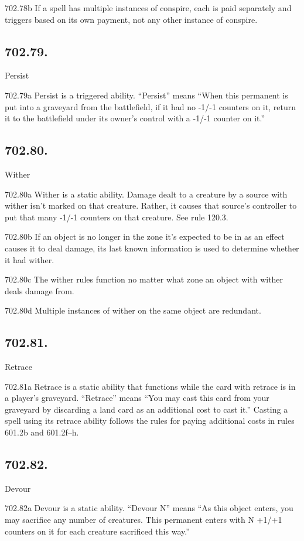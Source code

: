 702.78b If a spell has multiple instances of conspire, each is paid separately and triggers based on its own payment, not any other instance of conspire.

\subsection*{702.79.}
Persist

702.79a Persist is a triggered ability. “Persist” means “When this permanent is put into a graveyard from the battlefield, if it had no -1/-1 counters on it, return it to the battlefield under its owner’s control with a -1/-1 counter on it.”

\subsection*{702.80.}
Wither

702.80a Wither is a static ability. Damage dealt to a creature by a source with wither isn’t marked on that creature. Rather, it causes that source’s controller to put that many -1/-1 counters on that creature. See rule 120.3.

702.80b If an object is no longer in the zone it’s expected to be in as an effect causes it to deal damage, its last known information is used to determine whether it had wither.

702.80c The wither rules function no matter what zone an object with wither deals damage from.

702.80d Multiple instances of wither on the same object are redundant.

\subsection*{702.81.}
Retrace

702.81a Retrace is a static ability that functions while the card with retrace is in a player’s graveyard. “Retrace” means “You may cast this card from your graveyard by discarding a land card as an additional cost to cast it.” Casting a spell using its retrace ability follows the rules for paying additional costs in rules 601.2b and 601.2f–h.

\subsection*{702.82.}
Devour

702.82a Devour is a static ability. “Devour N” means “As this object enters, you may sacrifice any number of creatures. This permanent enters with N +1/+1 counters on it for each creature sacrificed this way.”

